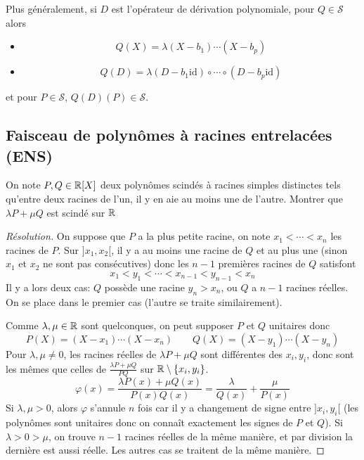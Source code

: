 \vspace{.2cm}

 Plus généralement, si $D$ est l'opérateur de dérivation polynomiale, pour $Q\in\mathcal S$ alors
\begin{itemize}
    \item
\[
    Q(X)=\lambda (X-b_1)\cdots (X-b_p)
\]
\item \[
        Q(D)=\lambda(D-b_1\mathrm{id})\circ \cdots \circ (D-b_p \mathrm{id})
    \]
\end{itemize}
et pour $P\in\mathcal S$, $Q(D)(P)\in\mathcal S$.

\subsection{Faisceau de polynômes à racines entrelacées (ENS)}

\begin{exo}
    On note $P, Q\in\mathbb R[X]$ deux polynômes scindés à racines simples distinctes tels qu'entre deux racines de l'un, il y en aie au moins une de l'autre. Montrer que $\lambda P+\mu Q$ est scindé sur $\mathbb R$
\end{exo}

\begin{proof}[Résolution]
    On suppose que $P$ a la plus petite racine, on note $x_1 <\cdots<x_n$ les racines de $P$. Sur $]x_1, x_2[$, il y a au moins une racine de $Q$ et au plus une (sinon $x_1$ et $x_2$ ne sont pas consécutives) donc les $n-1$ premières racines de $Q$ satisfont \[
        x_1<y_1<\cdots <x_{n-1}<y_{n-1}<x_n
    \]
    Il y a lors deux cas: $Q$ possède une racine $y_n>x_n$, ou $Q$ a $n-1$ racines réelles. On se place dans le premier cas (l'autre se traite similairement).

    Comme $\lambda, \mu\in\mathbb R$ sont quelconques, on peut supposer $P$ et $Q$ unitaires donc \[
        P(X)=(X-x_1)\cdots (X-x_n) \qquad Q(X)=(X-y_1)\cdots (X-y_n)
    \]
    Pour $\lambda, \mu\neq 0$, les racines réelles de $\lambda P+\mu Q$ sont différentes des $x_i, y_i$, donc sont les mêmes que celles de $\frac{\lambda P+\mu Q}{PQ}$ sur $\mathbb R\setminus \{x_i, y_i\}$. \[
        \varphi(x)=\frac{\lambda P(x)+\mu Q(x)}{P(x)Q(x)}=\frac\lambda{Q(x)}+\frac\mu{P(x)}
    \]
    Si $\lambda, \mu>0$, alors $\varphi$ s'annule $n$ fois car il y a changement de signe entre $]x_i, y_i[$ (les polynômes sont unitaires donc on connaît exactement les signes de $P$ et $Q$). Si $\lambda>0>\mu$, on trouve $n-1$ racines réelles de la même manière, et par division la dernière est aussi réelle. Les autres cas se traitent de la même manière.
\end{proof}

